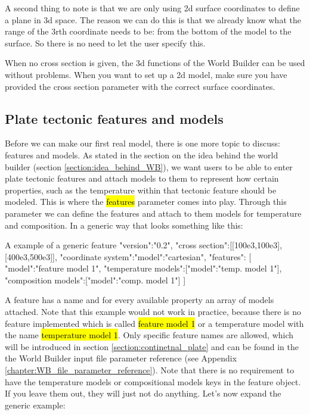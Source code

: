 \documentclass{book}
\newcommand{\WB}{{World Builder}}
\begin{document}
A second thing to note is that we are only using 2d surface coordinates to define a plane in 3d space. The reason we can do this is that we already know what the range of the 3rth coordinate needs to be: from the bottom of the model to the surface. So there is no need to let the user specify this.

When no cross section is given, the 3d functions of the \WB{} can be used without problems. When you want to set up a 2d model, make sure you have provided the cross section parameter with the correct surface coordinates.

\subsection{Plate tectonic features and models}
Before we can make our first real model, there is one more topic to discuss: features and models. As stated in the section on the idea behind the world builder (section \ref{section:idea_behind_WB}), we want users to be able to enter plate tectonic features and attach models to them to represent how certain properties, such as the temperature within that tectonic feature should be modeled. This is where the \hl{features} parameter comes into play. Through this parameter we can define the features and attach to them models for temperature and composition. In a generic way that looks something like this:

\begin{javascriptcode}{A example of a generic feature}{}
{
  "version":"0.2",
  "cross section":[[100e3,100e3],[400e3,500e3]],
  "coordinate system":{"model":"cartesian"},
  "features":
  [
    {
      "model":"feature model 1",
      "temperature models":[{"model":"temp. model 1"}],
      "composition models":[{"model":"comp. model 1"}]
    }
  ]
}
\end{javascriptcode}

A feature has a name and for every available property an array of models attached. Note that this example would not work in practice, because there is no feature implemented which is called \hl{feature model 1} or a temperature model with the name \hl{temperature model 1}. Only specific feature names are allowed, which will be introduced in section \ref{section:continetnal_plate} and can be found in the the \WB{} input file parameter reference (see Appendix \ref{chapter:WB_file_parameter_reference}). Note that there is no requirement to have the temperature models or compositional models keys in the feature object. If you leave them out, they will just not do anything. Let's now expand the generic example:
\end{document}
